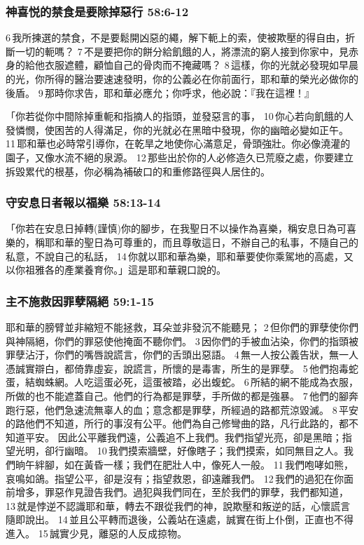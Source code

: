 \subsubsection{神喜悦的禁食是要除掉惡行 58:6-12}
6 我所揀選的禁食，不是要鬆開凶惡的繩，解下軛上的索，使被欺壓的得自由，折斷一切的軛嗎？ 7 不是要把你的餅分給飢餓的人，將漂流的窮人接到你家中，見赤身的給他衣服遮體，顧恤自己的骨肉而不掩藏嗎？ 8 這樣，你的光就必發現如早晨的光，你所得的醫治要速速發明，你的公義必在你前面行，耶和華的榮光必做你的後盾。 9 那時你求告，耶和華必應允；你呼求，他必說：『我在這裡！』

「你若從你中間除掉重軛和指摘人的指頭，並發惡言的事， 10 你心若向飢餓的人發憐憫，使困苦的人得滿足，你的光就必在黑暗中發現，你的幽暗必變如正午。 11 耶和華也必時常引導你，在乾旱之地使你心滿意足，骨頭強壯。你必像澆灌的園子，又像水流不絕的泉源。 12 那些出於你的人必修造久已荒廢之處，你要建立拆毀累代的根基，你必稱為補破口的和重修路徑與人居住的。

\subsubsection{守安息日者報以福樂 58:13-14}
「你若在安息日掉轉(謹慎)你的腳步，在我聖日不以操作為喜樂，稱安息日為可喜樂的，稱耶和華的聖日為可尊重的，而且尊敬這日，不辦自己的私事，不隨自己的私意，不說自己的私話， 14 你就以耶和華為樂，耶和華要使你乘駕地的高處，又以你祖雅各的產業養育你。」這是耶和華親口說的。


\subsubsection{主不施救因罪孽隔絕 59:1-15}
耶和華的膀臂並非縮短不能拯救，耳朵並非發沉不能聽見； 2 但你們的罪孽使你們與神隔絕，你們的罪惡使他掩面不聽你們。 3 因你們的手被血沾染，你們的指頭被罪孽沾汙，你們的嘴唇說謊言，你們的舌頭出惡語。 4 無一人按公義告狀，無一人憑誠實辯白，都倚靠虛妄，說謊言，所懷的是毒害，所生的是罪孽。 5 他們抱毒蛇蛋，結蜘蛛網。人吃這蛋必死，這蛋被踏，必出蝮蛇。 6 所結的網不能成為衣服，所做的也不能遮蓋自己。他們的行為都是罪孽，手所做的都是強暴。 7 他們的腳奔跑行惡，他們急速流無辜人的血；意念都是罪孽，所經過的路都荒涼毀滅。 8 平安的路他們不知道，所行的事沒有公平。他們為自己修彎曲的路，凡行此路的，都不知道平安。
因此公平離我們遠，公義追不上我們。我們指望光亮，卻是黑暗；指望光明，卻行幽暗。 10 我們摸索牆壁，好像瞎子；我們摸索，如同無目之人。我們晌午絆腳，如在黃昏一樣；我們在肥壯人中，像死人一般。 11 我們咆哮如熊，哀鳴如鴿。指望公平，卻是沒有；指望救恩，卻遠離我們。 12 我們的過犯在你面前增多，罪惡作見證告我們。過犯與我們同在，至於我們的罪孽，我們都知道， 13 就是悖逆不認識耶和華，轉去不跟從我們的神，說欺壓和叛逆的話，心懷謊言隨即說出。 14 並且公平轉而退後，公義站在遠處，誠實在街上仆倒，正直也不得進入。 15 誠實少見，離惡的人反成掠物。

